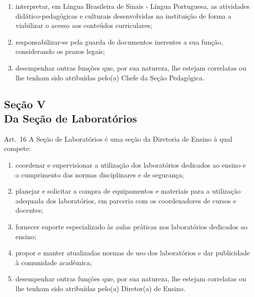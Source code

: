 \documentclass[a4paper,12pt]{report}
\begin{document}
\begin{enumerate}
\item interpretar, em Língua Brasileira de Sinais - Língua Portuguesa, as atividades 
      didático-pedagógicas e culturais desenvolvidas na instituição de forma a viabilizar 
      o acesso aos conteúdos curriculares;

\item responsabilizar-se pela guarda de documentos inerentes a sua função, considerando 
      os prazos legais;

\item desempenhar outras funções que, por sua natureza, lhe estejam correlatas ou lhe 
      tenham sido atribuídas pelo(a) Chefe da Seção Pedagógica.

\end{enumerate}


\subsection{Seção V \\ Da Seção de Laboratórios}

Art.~16 A Seção de Laboratórios é uma seção da Diretoria de Ensino à qual compete:

\begin{enumerate}
\renewcommand{\labelenumi}{\Roman{enumi}}

\item coordenar e supervisionar a utilização dos laboratórios dedicados ao ensino e o 
      cumprimento das normas disciplinares e de segurança;
      
\item planejar e solicitar a compra de equipamentos e materiais para a utilização adequada 
      dos laboratórios, em parceria com os coordenadores de cursos e docentes;

\item fornecer suporte especializado às aulas práticas nos laboratórios dedicados ao 
      ensino;

\item propor e manter atualizadas normas de uso dos laboratórios e dar publicidade à 
      comunidade acadêmica;

\item desempenhar outras funções que, por sua natureza, lhe estejam correlatas ou lhe 
      tenham sido atribuídas pelo(a) Diretor(a) de Ensino.
\end{enumerate}
\end{document}
